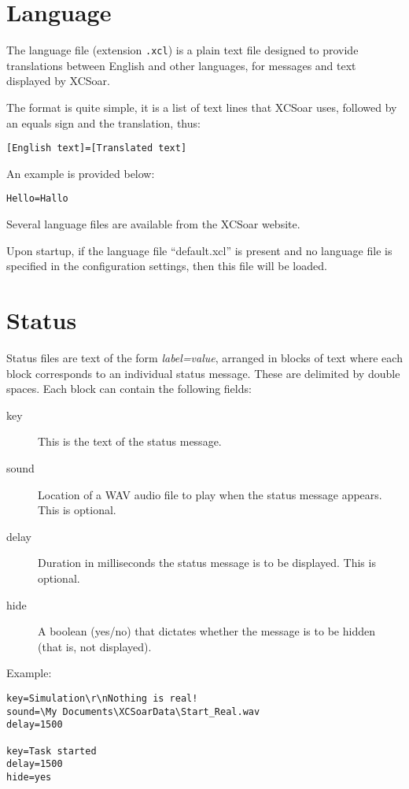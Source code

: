 \section{Language}
The language file (extension \verb|.xcl|) is a plain text file
designed to provide translations between English and other languages,
for messages and text displayed by XCSoar.

The format is quite simple, it is a list of text lines that XCSoar uses,
followed by an equals sign and the translation, thus:
\begin{verbatim}
[English text]=[Translated text]
\end{verbatim}

An example is provided below:
\begin{verbatim}
Hello=Hallo
\end{verbatim}

Several language files are available from the XCSoar website.

Upon startup, if the language file ``default.xcl'' is present and no
language file is specified in the configuration settings, then this
file will be loaded.

\section{Status}\label{sec:status}

Status files are text of the form {\em label=value}, arranged in
blocks of text where each block corresponds to an individual status
message.  These are delimited by double spaces.  Each block can
contain the following fields:
\begin{description}
\item[key]  This is the text of the status message.
\item[sound] Location of a WAV audio file to play when the status
  message appears.  This is optional.
\item[delay] Duration in milliseconds the status message is
  to be displayed.  This is optional.
\item[hide] A boolean (yes/no) that dictates whether the message
 is to be hidden (that is, not displayed). 
\end{description} 

Example:
\begin{verbatim}
key=Simulation\r\nNothing is real!
sound=\My Documents\XCSoarData\Start_Real.wav
delay=1500

key=Task started
delay=1500
hide=yes
\end{verbatim}
% 

